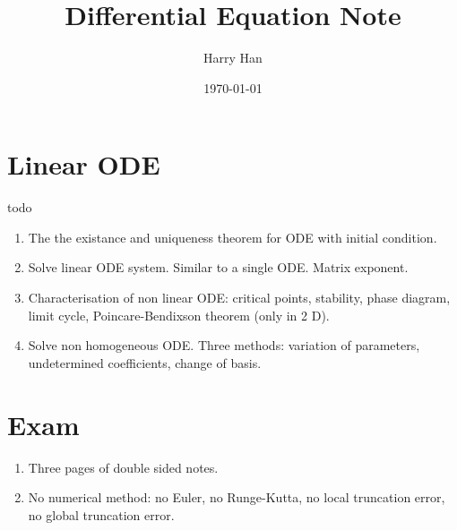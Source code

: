 \documentclass[12pt]{article}
\title{Differential Equation Note}
\author{Harry Han}
\date{\today}
\begin{document}
\section{Linear ODE}
\begin{definition}[ODE]
	todo
\end{definition}

\begin{enumerate}
	\item The the existance and uniqueness theorem for ODE with initial condition.
	\item Solve linear ODE system. Similar to a single ODE. Matrix exponent.
	\item Characterisation of non linear ODE: critical points, stability, phase diagram, limit cycle, Poincare-Bendixson theorem (only in 2 D).
	\item Solve non homogeneous ODE. Three methods: variation of parameters, undetermined coefficients, change of basis.
\end{enumerate}

\section{Exam}
\begin{enumerate}
	\item Three pages of double sided notes.
	\item No numerical method: no Euler, no Runge-Kutta, no local truncation error, no global truncation error.
\end{enumerate}
\end{document}
